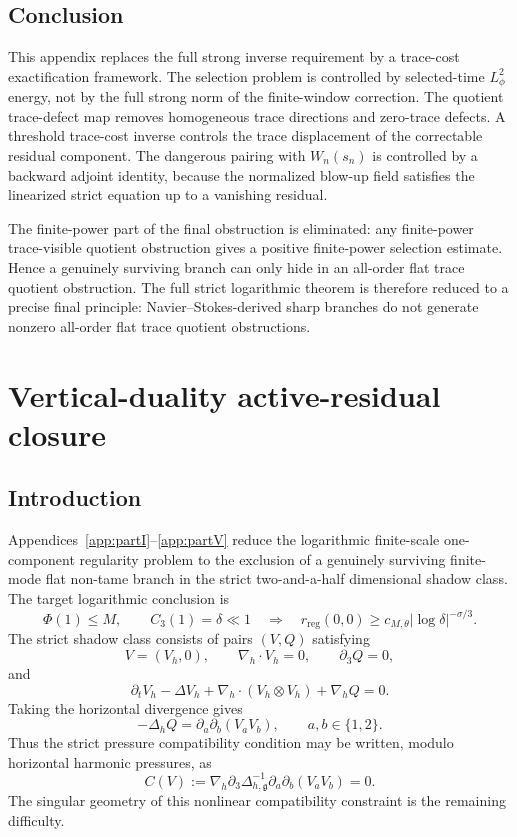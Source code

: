 \documentclass[11pt]{article}
\numberwithin{equation}{section}
\theoremstyle{plain}
\theoremstyle{definition}
\theoremstyle{remark}
\newcommand{\reg}{\mathrm{reg}}
\newcommand{\nabh}{\nabla_h}
\newcommand{\divh}{\nabla_h\!\cdot}
\begin{document}
\subsection{Conclusion}

This appendix replaces the full strong inverse requirement by a trace-cost exactification framework.  The selection problem is controlled by selected-time \(L^2_\phi\) energy, not by the full strong norm of the finite-window correction.  The quotient trace-defect map removes homogeneous trace directions and zero-trace defects.  A threshold trace-cost inverse controls the trace displacement of the correctable residual component.  The dangerous pairing with \(W_n(s_n)\) is controlled by a backward adjoint identity, because the normalized blow-up field satisfies the linearized strict equation up to a vanishing residual.

The finite-power part of the final obstruction is eliminated: any finite-power trace-visible quotient obstruction gives a positive finite-power selection estimate.  Hence a genuinely surviving branch can only hide in an all-order flat trace quotient obstruction.  The full strict logarithmic theorem is therefore reduced to a precise final principle: Navier--Stokes-derived sharp branches do not generate nonzero all-order flat trace quotient obstructions.

\section{Vertical-duality active-residual closure}\label{app:partVI}

\subsection{Introduction}

Appendices~\ref{app:partI}--\ref{app:partV} reduce the logarithmic finite-scale one-component regularity problem to the exclusion
of a genuinely surviving finite-mode flat non-tame branch in the strict two-and-a-half dimensional
shadow class.  The target logarithmic conclusion is
\begin{equation}\label{pVI:eq:target-log-rate}
        \Phi(1)\le M,\qquad C_3(1)=\delta\ll1
        \quad\Longrightarrow\quad
        r_{\reg}(0,0)\ge c_{M,\theta}|\log\delta|^{-\sigma/3}.
\end{equation}
The strict shadow class consists of pairs \((V,Q)\) satisfying
\[
        V=(V_h,0),\qquad \divh V_h=0,\qquad \partial_3 Q=0,
\]
and
\[
        \partial_tV_h-\Delta V_h+\divh(V_h\otimes V_h)+\nabh Q=0.
\]
Taking the horizontal divergence gives
\[
        -\Delta_h Q=\partial_a\partial_b(V_aV_b),
        \qquad a,b\in\{1,2\}.
\]
Thus the strict pressure compatibility condition may be written, modulo horizontal harmonic
pressures, as
\begin{equation}\label{pVI:eq:C-constraint}
        C(V)
        :=
        \nabh\partial_3\Delta_{h,\mathfrak g}^{-1}\partial_a\partial_b(V_aV_b)
        =
        0.
\end{equation}
The singular geometry of this nonlinear compatibility constraint is the remaining difficulty.
\end{document}

